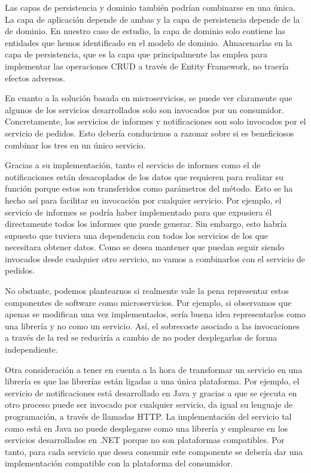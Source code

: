 \documentclass[11pt,spanish,listoffigures]{tfgetsinf}
\begin{document}
Las capas de persistencia y dominio también podrían combinarse en una única. La capa de aplicación depende de ambas y la capa de persistencia depende de la de dominio. En nuestro caso de estudio, la capa de dominio solo contiene las entidades que hemos identificado en el modelo de dominio. Almacenarlas en la capa de persistencia, que es la capa que principalmente las emplea para implementar las operaciones CRUD a través de Entity Framework, no traería efectos adversos.

En cuanto a la solución basada en microservicios, se puede ver claramente que algunos de los servicios desarrollados solo son invocados por un consumidor. Concretamente, los servicios de informes y notificaciones son solo invocados por el servicio de pedidos. Esto debería conducirnos a razonar sobre si es beneficiosos combinar los tres en un único servicio. 

Gracias a su implementación, tanto el servicio de informes como el de notificaciones están desacoplados de los datos que requieren para realizar su función porque estos son transferidos como parámetros del método. Esto se ha hecho así para facilitar su invocación por cualquier servicio. Por ejemplo, el servicio de informes se podría haber implementado para que expusiera él directamente todos los informes que puede generar. Sin embargo, esto habría supuesto que tuviera una dependencia con todos los servicios de los que necesitara obtener datos. Como se desea mantener que puedan seguir siendo invocados desde cualquier otro servicio, no vamos a combinarlos con el servicio de pedidos.

No obstante, podemos plantearnos si realmente vale la pena representar estos componentes de software como microservicios. Por ejemplo, si observamos que apenas se modifican una vez implementados, sería buena idea representarlos como una librería y no como un servicio. Así, el sobrecoste asociado a las invocaciones a través de la red se reduciría a cambio de no poder desplegarlos de forma independiente.

Otra consideración a tener en cuenta a la hora de transformar un servicio en una librería es que las librerías están ligadas a una única plataforma. Por ejemplo, el servicio de notificaciones está desarrollado en Java y gracias a que se ejecuta en otro proceso puede ser invocado por cualquier servicio, da igual su lenguaje de programación, a través de llamadas HTTP. La implementación del servicio tal como está en Java no puede desplegarse como una librería y emplearse en los servicios desarrollados en .NET porque no son plataformas compatibles. Por tanto, para cada servicio que desea consumir este componente se debería dar una implementación compatible con la plataforma del consumidor.
\end{document}
